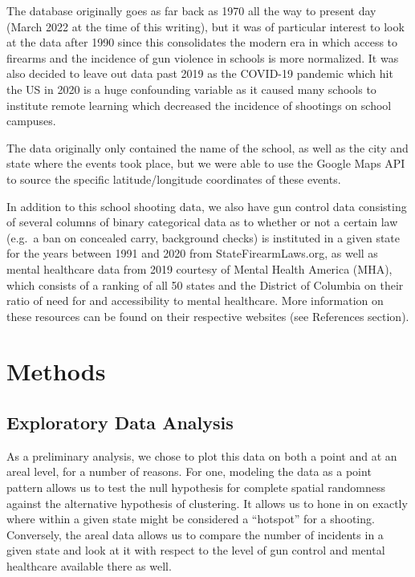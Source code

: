 \documentclass[12pt]{article}
\begin{document}
The database originally goes as far back as 1970 all the way to present day (March 2022 at the time of this writing), but it was of particular interest to look at the data after 1990 since this consolidates the modern era in which access to firearms and the incidence of gun violence in schools is more normalized. It was also decided to leave out data past 2019 as the COVID-19 pandemic which hit the US in 2020 is a huge confounding variable as it caused many schools to institute remote learning which decreased the incidence of shootings on school campuses.

The data originally only contained the name of the school, as well as the city and state where the events took place, but we were able to use the Google Maps API to source the specific latitude/longitude coordinates of these events.

In addition to this school shooting data, we also have gun control data consisting of several columns of binary categorical data as to whether or not a certain law (e.g.~a ban on concealed carry, background checks) is instituted in a given state for the years between 1991 and 2020 from StateFirearmLaws.org, as well as mental healthcare data from 2019 courtesy of Mental Health America (MHA), which consists of a ranking of all 50 states and the District of Columbia on their ratio of need for and accessibility to mental healthcare. More information on these resources can be found on their respective websites (see References section).

\hypertarget{methods}{%
\section{Methods}\label{methods}}

\hypertarget{exploratory-data-analysis}{%
\subsection{Exploratory Data Analysis}\label{exploratory-data-analysis}}

As a preliminary analysis, we chose to plot this data on both a point and at an areal level, for a number of reasons. For one, modeling the data as a point pattern allows us to test the null hypothesis for complete spatial randomness against the alternative hypothesis of clustering. It allows us to hone in on exactly where within a given state might be considered a ``hotspot'' for a shooting. Conversely, the areal data allows us to compare the number of incidents in a given state and look at it with respect to the level of gun control and mental healthcare available there as well.
\end{document}
